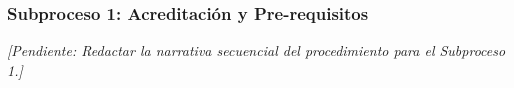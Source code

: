 \subsubsection{Subproceso 1: Acreditación y Pre-requisitos}

\textit{[Pendiente: Redactar la narrativa secuencial del procedimiento para el Subproceso 1.]}

